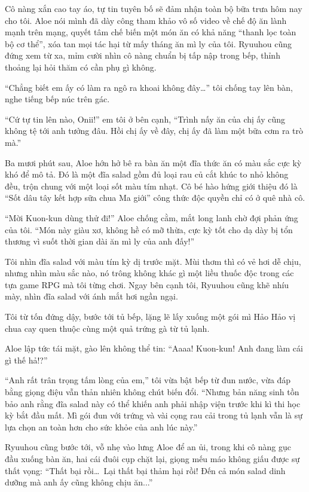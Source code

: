 \documentclass[../main.tex]{subfiles}
\begin{document}
Cô nàng xắn cao tay áo, tự tin tuyên bố sẽ đảm nhận toàn bộ bữa trưa hôm nay cho tôi. Aloe nói mình đã dày công tham khảo vô số video về chế độ ăn lành mạnh trên mạng, quyết tâm chế biến một món ăn có khả năng ``thanh lọc toàn bộ cơ thể'', xóa tan mọi tác hại từ mấy tháng ăn mì ly của tôi. Ryuuhou cũng đứng xem từ xa, mỉm cười nhìn cô nàng chuẩn bị tấp nập trong bếp, thỉnh thoảng lại hỏi thăm có cần phụ gì không.

``Chẳng biết em ấy có làm ra ngô ra khoai không đây\dots'' tôi chống tay lên bàn, nghe tiếng bếp núc trên gác.

``Cứ tự tin lên nào, Onii!'' em tôi ở bên cạnh, ``Trình nấy ăn của chị ấy cũng không tệ tới anh tưởng đâu. Hồi chị ấy về đây, chị ấy đã làm một bữa cơm ra trò mà.''

Ba mươi phút sau, Aloe hớn hở bê ra bàn ăn một đĩa thức ăn có màu sắc cực kỳ khó để mô tả. Đó là một đĩa salad gồm đủ loại rau củ cắt khúc to nhỏ không đều, trộn chung với một loại sốt màu tím nhạt. Cô bé hào hứng giới thiệu đó là ``Sốt dâu tây kết hợp sữa chua Ma giới'' công thức độc quyền chỉ có ở quê nhà cô.

``Mời Kuon-kun dùng thử đi!'' Aloe chống cằm, mắt long lanh chờ đợi phản ứng của tôi. ``Món này giàu xơ, không hề có mỡ thừa, cực kỳ tốt cho dạ dày bị tổn thương vì suốt thời gian dài ăn mì ly của anh đấy!''

Tôi nhìn đĩa salad với màu tím kỳ dị trước mặt. Mùi thơm thì có vẻ hơi dễ chịu, nhưng nhìn màu sắc nào, nó trông không khác gì một liều thuốc độc trong các tựa game RPG mà tôi từng chơi. Ngay bên cạnh tôi, Ryuuhou cũng khẽ nhíu mày, nhìn đĩa salad với ánh mắt hơi ngần ngại.

Tôi từ tốn đứng dậy, bước tới tủ bếp, lặng lẽ lấy xuống một gói mì Hảo Hảo vị chua cay quen thuộc cùng một quả trứng gà từ tủ lạnh.

Aloe lập tức tái mặt, gào lên không thể tin: ``Aaaa! Kuon-kun! Anh đang làm cái gì thế hả!?''

``Anh rất trân trọng tấm lòng của em,'' tôi vừa bật bếp từ đun nước, vừa đáp bằng giọng điệu vẫn thản nhiên không chút biến đổi. ``Nhưng bản năng sinh tồn bảo anh rằng đĩa salad này có thể khiến anh phải nhập viện trước khi kì thi học kỳ bắt đầu mất. Mì gói đun với trứng và vài cọng rau cải trong tủ lạnh vẫn là sự lựa chọn an toàn hơn cho sức khỏe của anh lúc này.''

Ryuuhou cũng bước tới, vỗ nhẹ vào lưng Aloe để an ủi, trong khi cô nàng gục đầu xuống bàn ăn, hai cái đuôi cụp chặt lại, giọng mếu máo không giấu được sự thất vọng: ``Thất bại rồi\dots\ Lại thất bại thảm hại rồi! Đến cả món salad dinh dưỡng mà anh ấy cũng không chịu ăn...''
\end{document}
